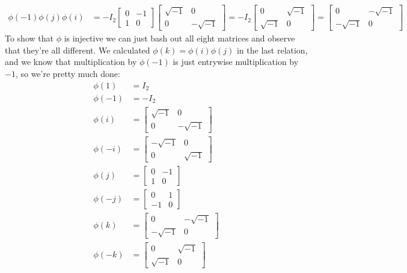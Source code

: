 \documentclass[]{article}
\begin{document}
\begin{enumerate}
\begin{enumerate}
\begin{align}
\phi(-1)\phi(j)\phi(i) &= -I_2\begin{bmatrix}0&-1\\1&0\end{bmatrix} \begin{bmatrix}\sqrt{-1}&0\\0&-\sqrt{-1}\end{bmatrix} = -I_2\begin{bmatrix}0&\sqrt{-1}\\\sqrt{-1}&0\end{bmatrix} = \begin{bmatrix}0&-\sqrt{-1}\\-\sqrt{-1}&0\end{bmatrix}
\end{align}
To show that $\phi$ is injective we can just bash out all eight matrices and observe that they're all different. We calculated $\phi(k) = \phi(i)\phi(j)$ in the last relation, and we know that multiplication by $\phi(-1)$ is just entrywise multiplication by $-1$, so we're pretty much done:
\begin{align}
\phi(1) &= I_2 \\
\phi(-1) &= -I_2 \\
\phi(i) &= \begin{bmatrix}\sqrt{-1}&0\\0&-\sqrt{-1}\end{bmatrix} \\
\phi(-i) &= \begin{bmatrix}-\sqrt{-1}&0\\0&\sqrt{-1}\end{bmatrix} \\
\phi(j) &= \begin{bmatrix}0&-1\\1&0\end{bmatrix} \\
\phi(-j) &= \begin{bmatrix}0&1\\-1&0\end{bmatrix} \\
\phi(k) &= \begin{bmatrix}0&-\sqrt{-1}\\-\sqrt{-1}&0\end{bmatrix} \\
\phi(-k) &= \begin{bmatrix}0&\sqrt{-1}\\\sqrt{-1}&0\end{bmatrix}
\end{align}
\end{enumerate}


\end{enumerate}
\end{document}
